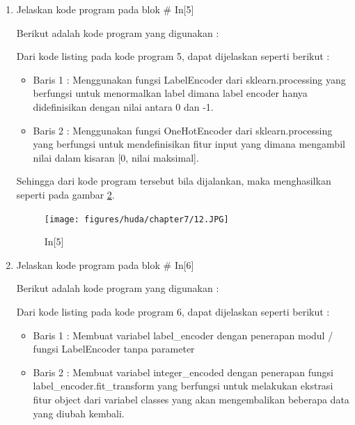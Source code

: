 \begin{enumerate}
\begin{itemize}
\end{itemize}
\par Sehingga dari kode program tersebut bila dijalankan, maka menghasilkan seperti pada gambar \ref{c7_11}.
\begin{figure}[!htbp]
	\centerline{\texttt{[image: figures/huda/chapter7/11.JPG]}}
	\caption{In[4]}
	\label{c7_11}
\end{figure}
\item Jelaskan kode program pada blok \# In[5]
\par Berikut adalah kode program yang digunakan :

\par Dari kode listing pada kode program 5, dapat dijelaskan seperti berikut :
\begin{itemize}
\item Baris 1	: Menggunakan fungsi LabelEncoder dari sklearn.processing yang berfungsi untuk menormalkan label dimana label encoder hanya didefinisikan dengan nilai antara 0 dan -1.
\item Baris 2	: Menggunakan fungsi OneHotEncoder dari sklearn.processing yang berfungsi untuk mendefinisikan fitur input yang dimana mengambil nilai dalam kisaran [0, nilai maksimal].
\end{itemize}
\par Sehingga dari kode program tersebut bila dijalankan, maka menghasilkan seperti pada gambar \ref{c7_12}.
\begin{figure}[!htbp]
	\centerline{\texttt{[image: figures/huda/chapter7/12.JPG]}}
	\caption{In[5]}
	\label{c7_12}
\end{figure}
\item Jelaskan kode program pada blok \# In[6]
\par Berikut adalah kode program yang digunakan :

\par Dari kode listing pada kode program 6, dapat dijelaskan seperti berikut :
\begin{itemize}
\item Baris 1	: Membuat variabel label\_encoder dengan penerapan modul / fungsi LabelEncoder tanpa parameter
\item Baris 2	: Membuat variabel integer\_encoded dengan penerapan fungsi label\_encoder.fit\_transform yang berfungsi untuk melakukan ekstrasi fitur object dari variabel classes yang akan mengembalikan beberapa data yang diubah kembali.
\end{itemize}

\end{enumerate}
